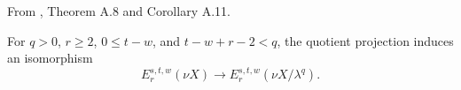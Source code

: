 \begin{theorem}
\label{sem:Literature:finite-quotient-safe}
From \cite{BHS}, Theorem A.8 and Corollary A.11.\par

For $q>0$, $r\ge2$, $0\le t-w$, and $t-w+r-2<q$, the quotient projection induces an isomorphism
\[E_r^{s,t,w}(\nu X)\longrightarrow E_r^{s,t,w}(\nu X/\lambda^q).\]
\end{theorem}

